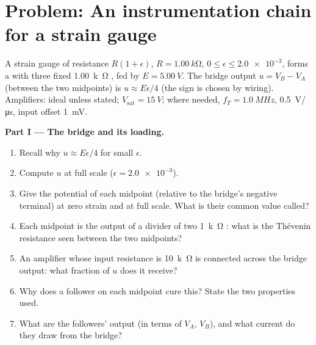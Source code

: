 \section{Problem: An instrumentation chain for a strain gauge}

\begin{problem}
\label{pb:b1:operational-amplifier:1}
A strain gauge of resistance $R(1 + \epsilon)$, $R = \qty{1.00}{k\ohm}$,
$0 \leq \epsilon \leq \num{2.0e-3}$, forms a  with
three fixed \qty{1.00}{k\ohm} , fed by $E = \qty{5.00}{V}$.
The bridge output $u = V_B - V_A$ (between the two midpoints) is
$u \approx E\epsilon/4$ (the sign is chosen by wiring). Amplifiers:
ideal unless stated; $V_{\mathrm{sat}} = \qty{15}{V}$; where needed,
$f_T = \qty{1.0}{MHz}$,  \qty{0.5}{V/\micro s}, input offset
\qty{1}{mV}.

\medskip
\noindent\textbf{Part I --- The bridge and its loading.}
\begin{enumerate}
  \item Recall why $u \approx E\epsilon/4$ for small $\epsilon$.
  \item Compute $u$ at full scale ($\epsilon = \num{2.0e-3}$).
  \item Give the potential of each midpoint (relative to the bridge's
        negative terminal) at zero strain and at full scale. What is
        their common value called?
  \item Each midpoint is the output of a divider of two \qty{1}{k\ohm}
        : what is the Th\'evenin resistance seen between the
        two midpoints?
  \item An amplifier whose input resistance is \qty{10}{k\ohm} is
        connected across the bridge output: what fraction of $u$ does it
        receive?
  \item Why does a follower on each midpoint cure this? State the two
        properties used.
  \item What are the followers' output  (in terms of $V_A$,
        $V_B$), and what current do they draw from the bridge?
\end{enumerate}


\end{problem}
